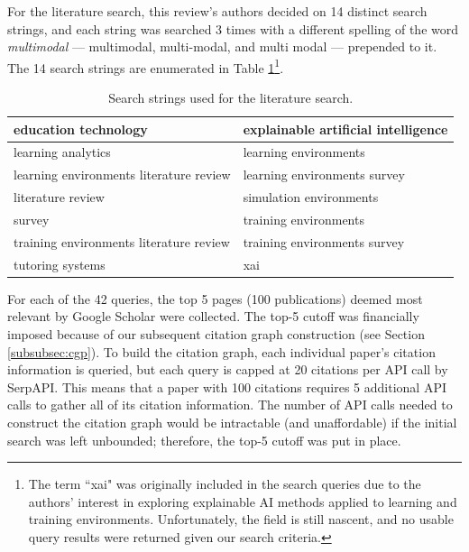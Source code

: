 \documentclass[manuscript,screen,review]{acmart}
\begin{document}
For the literature search, this review's authors decided on 14 distinct search strings, and each string was searched 3 times with a different spelling of the word \textit{multimodal} --- multimodal, multi-modal, and multi modal --- prepended to it. The 14 search strings are enumerated in Table \ref{tab:search_terms}\footnote{The term ``xai" was originally included in the search queries due to the authors' interest in exploring explainable AI methods applied to learning and training environments. Unfortunately, the field is still nascent, and no usable query results were returned given our search criteria.}.

\begin{table}[htbp]
    \renewcommand{\arraystretch}{1.3}%
    \centering
    \caption{Search strings used for the literature search.}
    \begin{tabularx}{\linewidth}{l@{\hskip .25in} l@{\hskip .25in}}
    
        \midrule
        education technology & explainable artificial intelligence \\

        \midrule
        learning analytics & learning environments \\
        
        \midrule
        learning environments literature review & learning environments survey \\
    
        \midrule
        literature review & simulation environments \\
        
        \midrule
        survey & training environments \\
        
        \midrule
        training environments literature review & training environments survey \\
        
        \midrule
        tutoring systems & xai \\

        \bottomrule
    \end{tabularx}
    \label{tab:search_terms}
\end{table}

For each of the 42 queries, the top 5 pages (100 publications) deemed most relevant by Google Scholar were collected. The top-5 cutoff was financially imposed because of our subsequent citation graph construction (see Section \ref{subsubsec:cgp}). To build the citation graph, each individual paper's citation information is queried, but each query is capped at 20 citations per API call by SerpAPI. This means that a paper with 100 citations requires 5 additional API calls to gather all of its citation information. The number of API calls needed to construct the citation graph would be intractable (and unaffordable) if the initial search was left unbounded; therefore, the top-5 cutoff was put in place.
\end{document}
